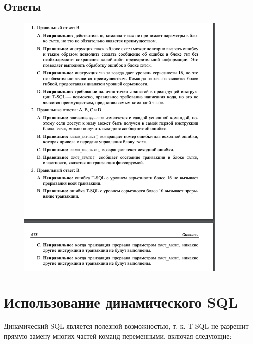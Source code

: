 \subsection*{Ответы}

\begin{figure}[h!]
	\begin{center}
		\includegraphics[width=0.9\textwidth]{img/ans28.png}
	\end{center}
	\captionsetup{justification=centering}
\end{figure}



\section{Использование динамического SQL}


Динамический SQL является полезной возможностью, т. к. T-SQL не разрешит
прямую замену многих частей команд переменными, включая следующие: 

